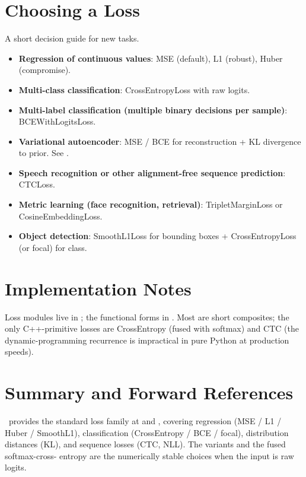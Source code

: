\section{Choosing a Loss}
\label{sec:losses:choosing}

A short decision guide for new tasks.

\begin{itemize}
  \item \textbf{Regression of continuous values}: MSE (default),
    L1 (robust), Huber (compromise).
  \item \textbf{Multi-class classification}: CrossEntropyLoss with
    raw logits.
  \item \textbf{Multi-label classification (multiple binary
    decisions per sample)}: BCEWithLogitsLoss.
  \item \textbf{Variational autoencoder}: MSE / BCE for
    reconstruction + KL divergence to prior. See
    .
  \item \textbf{Speech recognition or other alignment-free
    sequence prediction}: CTCLoss.
  \item \textbf{Metric learning (face recognition, retrieval)}:
    TripletMarginLoss or CosineEmbeddingLoss.
  \item \textbf{Object detection}: SmoothL1Loss for bounding
    boxes + CrossEntropyLoss (or focal) for class.
\end{itemize}

\section{Implementation Notes}
\label{sec:losses:impl_notes}

Loss modules live in ; the
functional forms in .
Most are short composites; the only C++-primitive losses are
CrossEntropy (fused with softmax) and CTC (the dynamic-programming
recurrence is impractical in pure Python at production speeds).

\section{Summary and Forward References}
\label{sec:losses:summary}

\Lucid\ provides the standard loss family at  and
, covering regression (MSE / L1 / Huber
/ SmoothL1), classification (CrossEntropy / BCE / focal),
distribution distances (KL), and sequence losses (CTC, NLL). The
 variants and the fused softmax-cross-
entropy are the numerically stable choices when the input is raw
logits.

